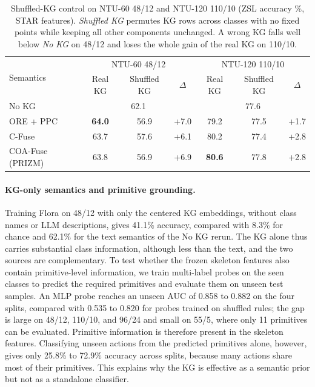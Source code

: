 \documentclass[11pt]{article}
\begin{document}
\begin{table}[htbp]
\centering
\caption{Shuffled-KG control on NTU-60 48/12 and NTU-120 110/10 (ZSL accuracy \%, STAR features). \emph{Shuffled KG} permutes KG rows across classes with no fixed points while keeping all other components unchanged. A wrong KG falls well below \emph{No KG} on 48/12 and loses the whole gain of the real KG on 110/10.}
\label{tab:ablation-shuffle}
\small
\begin{tabular}{l|ccc|ccc}
\hline
\multirow{2}{*}{Semantics} & \multicolumn{3}{c|}{NTU-60 48/12} & \multicolumn{3}{c}{NTU-120 110/10} \\
& Real KG & Shuffled KG & $\Delta$ & Real KG & Shuffled KG & $\Delta$ \\
\hline
No KG & \multicolumn{3}{c|}{62.1} & \multicolumn{3}{c}{77.6} \\
\hline
ORE + PPC & \textbf{64.0} & 56.9 & +7.0 & 79.2 & 77.5 & +1.7 \\
C-Fuse & 63.7 & 57.6 & +6.1 & 80.2 & 77.4 & +2.8 \\
COA-Fuse (PRIZM) & 63.8 & 56.9 & +6.9 & \textbf{80.6} & 77.8 & +2.8 \\
\hline
\end{tabular}
\end{table}

\paragraph{KG-only semantics and primitive grounding.}
Training Flora on 48/12 with only the centered KG embeddings, without class names or LLM descriptions, gives 41.1\% accuracy, compared with 8.3\% for chance and 62.1\% for the text semantics of the No KG rerun. The KG alone thus carries substantial class information, although less than the text, and the two sources are complementary. To test whether the frozen skeleton features also contain primitive-level information, we train multi-label probes on the seen classes to predict the required primitives and evaluate them on unseen test samples. An MLP probe reaches an unseen AUC of 0.858 to 0.882 on the four splits, compared with 0.535 to 0.820 for probes trained on shuffled rules; the gap is large on 48/12, 110/10, and 96/24 and small on 55/5, where only 11 primitives can be evaluated. Primitive information is therefore present in the skeleton features. Classifying unseen actions from the predicted primitives alone, however, gives only 25.8\% to 72.9\% accuracy across splits, because many actions share most of their primitives. This explains why the KG is effective as a semantic prior but not as a standalone classifier.
\end{document}
